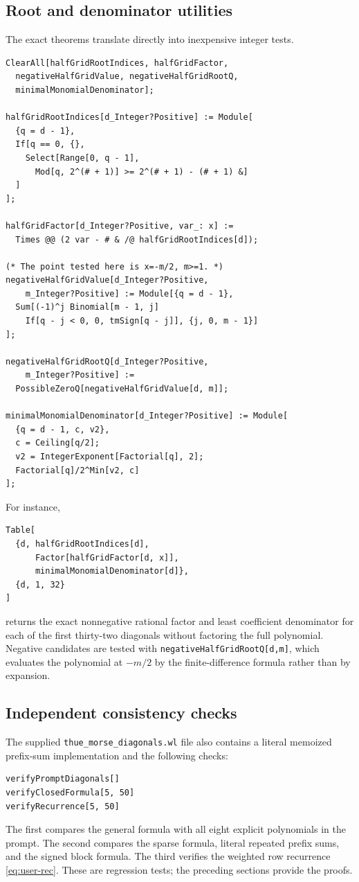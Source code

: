 \documentclass[11pt]{article}
\theoremstyle{definition}
\theoremstyle{remark}
\begin{document}
\subsection{Root and denominator utilities}

The exact theorems translate directly into inexpensive integer tests.

\begin{lstlisting}[language=Wolfram,caption={Exact rational-root tests and coefficient denominator.}]
ClearAll[halfGridRootIndices, halfGridFactor,
  negativeHalfGridValue, negativeHalfGridRootQ,
  minimalMonomialDenominator];

halfGridRootIndices[d_Integer?Positive] := Module[
  {q = d - 1},
  If[q == 0, {},
    Select[Range[0, q - 1],
      Mod[q, 2^(# + 1)] >= 2^(# + 1) - (# + 1) &]
  ]
];

halfGridFactor[d_Integer?Positive, var_: x] :=
  Times @@ (2 var - # & /@ halfGridRootIndices[d]);

(* The point tested here is x=-m/2, m>=1. *)
negativeHalfGridValue[d_Integer?Positive,
    m_Integer?Positive] := Module[{q = d - 1},
  Sum[(-1)^j Binomial[m - 1, j]
    If[q - j < 0, 0, tmSign[q - j]], {j, 0, m - 1}]
];

negativeHalfGridRootQ[d_Integer?Positive,
    m_Integer?Positive] :=
  PossibleZeroQ[negativeHalfGridValue[d, m]];

minimalMonomialDenominator[d_Integer?Positive] := Module[
  {q = d - 1, c, v2},
  c = Ceiling[q/2];
  v2 = IntegerExponent[Factorial[q], 2];
  Factorial[q]/2^Min[v2, c]
];
\end{lstlisting}

For instance,
\begin{lstlisting}[language=Wolfram]
Table[
  {d, halfGridRootIndices[d],
      Factor[halfGridFactor[d, x]],
      minimalMonomialDenominator[d]},
  {d, 1, 32}
]
\end{lstlisting}
returns the exact nonnegative rational factor and least coefficient
denominator for each of the first thirty-two diagonals without factoring the
full polynomial.  Negative candidates are tested with
\texttt{negativeHalfGridRootQ[d,m]}, which evaluates the polynomial at
\(-m/2\) by the finite-difference formula rather than by expansion.

\subsection{Independent consistency checks}

The supplied \texttt{thue\_morse\_diagonals.wl} file also contains a literal
memoized prefix-sum implementation and the following checks:
\begin{lstlisting}[language=Wolfram]
verifyPromptDiagonals[]
verifyClosedFormula[5, 50]
verifyRecurrence[5, 50]
\end{lstlisting}
The first compares the general formula with all eight explicit polynomials in
the prompt.  The second compares the sparse formula, literal repeated prefix
sums, and the signed block formula.  The third verifies the weighted row
recurrence \cref{eq:user-rec}.  These are regression tests; the preceding
sections provide the proofs.
\end{document}

